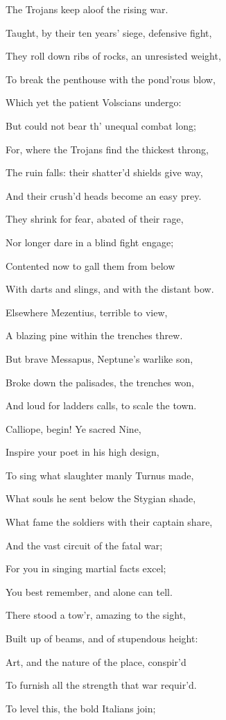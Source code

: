 The Trojans keep aloof the rising war.

Taught, by their ten years’ siege, defensive fight,

They roll down ribs of rocks, an unresisted weight,

To break the penthouse with the pond’rous blow,

Which yet the patient Volscians undergo:

But could not bear th’ unequal combat long;

For, where the Trojans find the thickest throng,

The ruin falls: their shatter’d shields give way,

And their crush’d heads become an easy prey.

They shrink for fear, abated of their rage,

Nor longer dare in a blind fight engage;

Contented now to gall them from below

With darts and slings, and with the distant bow.

Elsewhere Mezentius, terrible to view,

A blazing pine within the trenches threw.

But brave Messapus, Neptune’s warlike son,

Broke down the palisades, the trenches won,

And loud for ladders calls, to scale the town.

Calliope, begin! Ye sacred Nine,

Inspire your poet in his high design,

To sing what slaughter manly Turnus made,

What souls he sent below the Stygian shade,

What fame the soldiers with their captain share,

And the vast circuit of the fatal war;

For you in singing martial facts excel;

You best remember, and alone can tell.

There stood a tow’r, amazing to the sight,

Built up of beams, and of stupendous height:

Art, and the nature of the place, conspir’d

To furnish all the strength that war requir’d.

To level this, the bold Italians join;

